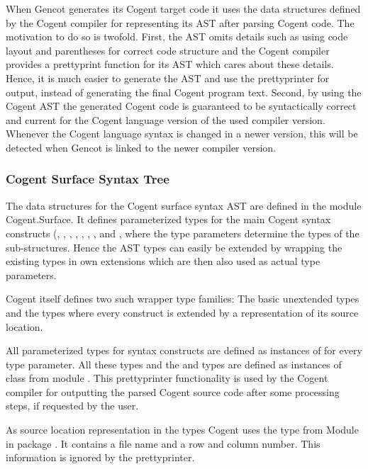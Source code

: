 When Gencot generates its Cogent target code it uses the data structures defined by the Cogent compiler for representing
its AST after parsing Cogent code. The motivation to do so is twofold. First, the AST omits details such as using code layout
and parentheses for correct code structure and the Cogent compiler provides a prettyprint function for its AST which cares
about these details. Hence, it is much easier to generate the AST and use the prettyprinter for output, instead of generating
the final Cogent program text. Second, by using the Cogent AST the generated Cogent code is guaranteed to be syntactically correct and
current for the Cogent language version of the used compiler version. Whenever the Cogent language syntax is changed
in a newer version, this will be detected when Gencot is linked to the newer compiler version.

\subsubsection{Cogent Surface Syntax Tree}

The data structures for the Cogent surface syntax AST are defined in the module Cogent.Surface. It defines parameterized types
for the main Cogent syntax constructs (, , , , , 
, , and , where the type parameters determine the types of the 
sub-structures. Hence the AST types
can easily be extended by wrapping the existing types in own extensions which are then also used as actual type parameters.

Cogent itself defines two such wrapper type families: The basic unextended types  and the types 
where every construct is extended by a representation of its source location. 

All parameterized types for syntax constructs are defined as instances of  for every type parameter.
All these types and the  and  types are defined as instances of class  from
module . This prettyprinter functionality is used by the Cogent compiler for outputting
the parsed Cogent source code after some processing steps, if requested by the user.

As source location representation in the  types Cogent uses the type  from Module 
 in package .
It contains a file name and a row and column number. This information is ignored by the prettyprinter.

